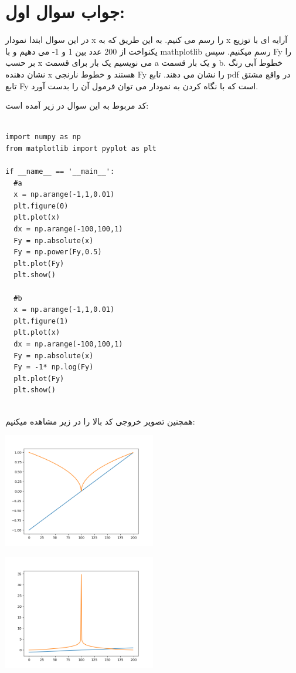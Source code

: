 \documentclass[a4paper,14pt]{article}
\begin{document}
	\newpage
	
	
\section*{جواب سوال اول:}	
در این سوال ابتدا نمودار x را رسم می کنیم. به این طریق که به x آرایه ای با توزیع یکنواخت از 200 عدد بین 1 و 1- می دهیم و با mathplotlib رسم میکنیم. سپس Fy را بر حسب x می نویسیم یک بار برای قسمت a و یک بار قسمت b. خطوط آبی رنگ نشان دهنده x هستند و خطوط نارنجی Fy را نشان می دهند.  تابع pdf در واقع مشتق تابع Fy است که با نگاه کردن به نمودار می توان فرمول آن را بدست آورد.

کد مربوط به این سوال در زیر آمده است:\\

\fontsize{12}{12}\selectfont
\begin{latin}
	\begin{lstlisting}
		
import numpy as np
from matplotlib import pyplot as plt

if __name__ == '__main__':
  #a
  x = np.arange(-1,1,0.01)
  plt.figure(0)
  plt.plot(x)
  dx = np.arange(-100,100,1)
  Fy = np.absolute(x)
  Fy = np.power(Fy,0.5)
  plt.plot(Fy)
  plt.show()

  #b
  x = np.arange(-1,1,0.01)
  plt.figure(1)
  plt.plot(x)
  dx = np.arange(-100,100,1)
  Fy = np.absolute(x)
  Fy = -1* np.log(Fy)
  plt.plot(Fy)
  plt.show()
		
	\end{lstlisting}
\end{latin}
\fontsize{14}{14}\selectfont

همچنین تصویر خروجی کد بالا را در زیر مشاهده میکنیم:\\

\begin{center}
	\includegraphics[width=0.5\textwidth]{Figures/fig_1.png}
\end{center}
\begin{center}
	\includegraphics[width=0.5\textwidth]{Figures/fig_2.png}
\end{center}
\end{document}
